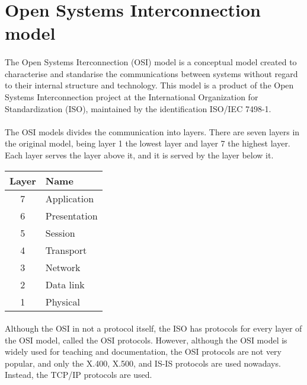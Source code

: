 \documentclass[12pt,a4paper]{report}
\begin{document}
\section{Open Systems Interconnection model \cite{InternationalTelecommunicationUnion1994}}

\paragraph{}The Open Systems Iterconnection (OSI) model is a conceptual model created to characterise and standarise the communications between systems without regard to their internal structure and technology. This model is a product of the Open Systems Interconnection project at the International Organization for Standardization (ISO), maintained by the identification ISO/IEC 7498-1. 

\paragraph{}The OSI models divides the communication into layers. There are seven layers in the original model, being layer 1 the lowest layer and layer 7 the highest layer. Each layer serves the layer above it, and it is served by the layer below it.
\\
\begin{center}
\begin{tabular}{|c|l|}
\hline 
\textbf{Layer} & \textbf{Name} \\ 
\hline 
7 & Application \\ 
\hline 
6 & Presentation \\ 
\hline 
5 & Session \\ 
\hline 
4 & Transport \\ 
\hline 
3 & Network \\ 
\hline 
2 & Data link \\ 
\hline 
1 & Physical \\ 
\hline 
\end{tabular} 
\end{center}
\paragraph{}Although the OSI in not a protocol itself, the ISO has protocols for every layer of the OSI model, called the OSI protocols. However, although the OSI model is widely used for teaching and documentation, the OSI protocols are not very popular, and only the X.400, X.500, and IS-IS protocols are used nowadays. Instead, the TCP/IP protocols are used.
\end{document}
